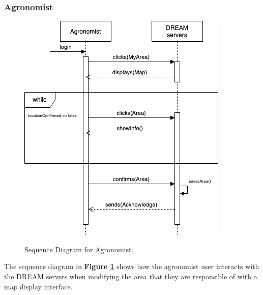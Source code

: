 \newpage
\subsubsection{Agronomist}

\begin{figure}[hpt!]
\centering
\includegraphics[scale=0.6]{Files/sequence_disgrams/thePNGs/agronomist_choosingLocation.png}\\
\caption{\label{fig:agrSeqArea}Sequence Diagram for Agronomist.}
\end{figure}

\begin{flushleft}
The sequence diagram in \textbf{Figure \ref{fig:agrSeqArea}} shows how the agronomist user interacts with the DREAM servers when modifying the area that they are responsible of with a map display interface.
\end{flushleft}


